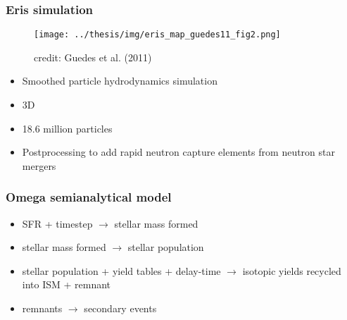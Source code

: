 \begin{frame}
  \frametitle{Eris simulation}
  \begin{minipage}{0.45\linewidth}
    \begin{figure}
      \centering
      \texttt{[image: ../thesis/img/eris\_map\_guedes11\_fig2.png]}
      \caption{credit: Guedes et al. (2011) }
    \end{figure}
  \end{minipage}
  \hfill
  \begin{minipage}{0.45\linewidth}
    \begin{itemize}
    \item Smoothed particle hydrodynamics simulation 
    \item 3D 
    \item 18.6 million particles
    \item Postprocessing to add rapid neutron capture elements from neutron star mergers 
    \end{itemize}
  \end{minipage}
\end{frame}

\begin{frame}
  \frametitle{Omega semianalytical model }
  \begin{itemize}
  \item SFR + timestep $\rightarrow$ stellar mass formed
  \item stellar mass formed $\rightarrow$ stellar population
  \item stellar population + yield tables + delay-time $\rightarrow$ isotopic yields recycled into ISM + remnant
  \item remnants $\rightarrow$ secondary events
  \end{itemize}
\end{frame}

\begin{frame}
  \centering
  \textbf{
    \Large
    \mytitle
  }
\end{frame}
